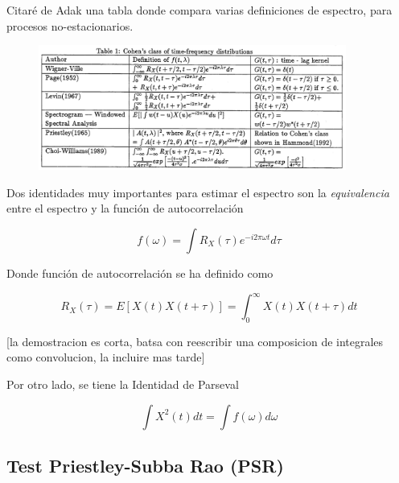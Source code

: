 Citar\'e de Adak \cite{Adak98} una tabla donde compara varias definiciones de espectro, para
procesos no-estacionarios.

\begin{figure}[h]
\centering
\includegraphics[width=0.9\textwidth]{tabla.png} 
\end{figure}

Dos identidades muy importantes para estimar el espectro son la \textit{equivalencia} entre
el espectro y la funci\'on de autocorrelaci\'on

\begin{equation*}
f(\omega ) = \int R_X(\tau ) e^{-i 2\pi \omega t} d\tau
\end{equation*}

Donde funci\'on de autocorrelaci\'on se ha definido como

\begin{equation*}
R_X(\tau) = E\left[ X(t) X(t+\tau) \right] = \int_0^{\infty} X(t)X(t+\tau) dt
\end{equation*}

[la demostracion es corta, batsa con reescribir una composicion de integrales como convolucion,
la incluire mas tarde]

Por otro lado, se tiene la Identidad de Parseval

\begin{equation*}
\int X^{2}(t) dt = \int f(\omega) d\omega
\end{equation*}



\subsection{Test Priestley-Subba Rao (PSR)}

